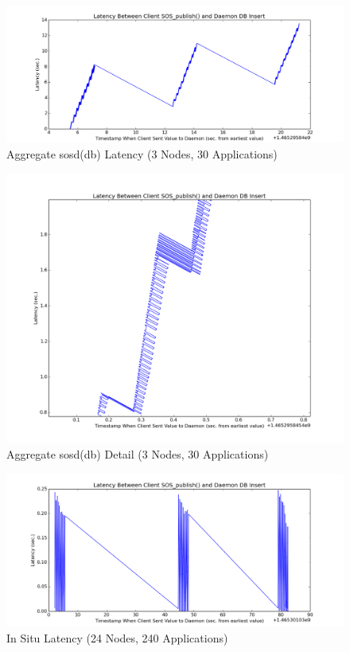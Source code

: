 \begin{figure}[h]
\centering
\includegraphics[width=\columnwidth]{images/aciss_latency_3_agg.png}
\caption{Aggregate sosd(db) Latency (3 Nodes, 30 Applications)}
\label{aciss_lat_3_agg}
\end{figure}

\begin{figure}[h]
\centering
\includegraphics[width=\columnwidth]{images/aciss_latency_3_agg_zm.png}
\caption{Aggregate sosd(db) Detail (3 Nodes, 30 Applications)}
\label{aciss_lat_3_agg_detail}
\end{figure}

\begin{figure}[h]
\centering
\includegraphics[width=\columnwidth]{images/aciss_latency_24_situ.png}
\caption{In Situ Latency (24 Nodes, 240 Applications)}
\label{aciss_lat_24_situ}
\end{figure}

